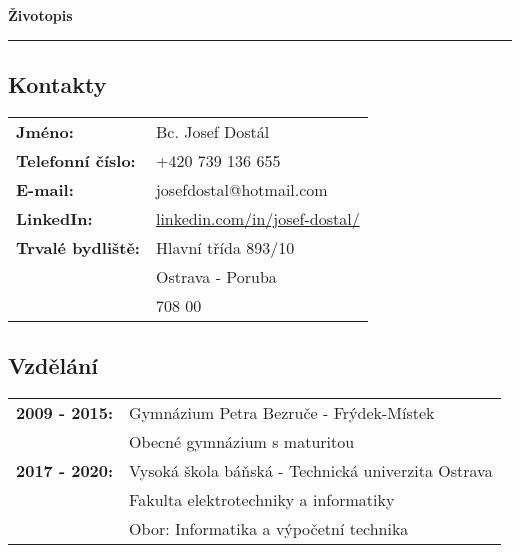 \documentclass[a4paper]{article}
\begin{document}
\begin{center}
    \huge{\textbf{Životopis}}
    \par\noindent\rule{\textwidth}{0.4pt}
\end{center}

\subsection*{Kontakty}
\begin{tabular}{>{\bfseries}l l}
    Jméno:           & Bc. Josef Dostál \\
    Telefonní číslo: & +420 739 136 655 \\
    E-mail:          & josefdostal@hotmail.com \\
    LinkedIn:        & \href {https://www.linkedin.com/in/josef-dostal/}
                             {linkedin.com/in/josef-dostal/} \\
    Trvalé bydliště: & Hlavní třída 893/10 \\
                     & Ostrava - Poruba \\
                     & 708 00
\end{tabular}

\subsection*{Vzdělání}
\begin{tabular}{>{\bfseries}l l}
    2009 - 2015: & Gymnázium Petra Bezruče - Frýdek-Místek \\
                 & Obecné gymnázium s maturitou \\
    2017 - 2020: & Vysoká škola báňská - Technická univerzita Ostrava \\
                 & Fakulta elektrotechniky a informatiky \\
                 & Obor: Informatika a výpočetní technika \\
\end{tabular}
\end{document}
